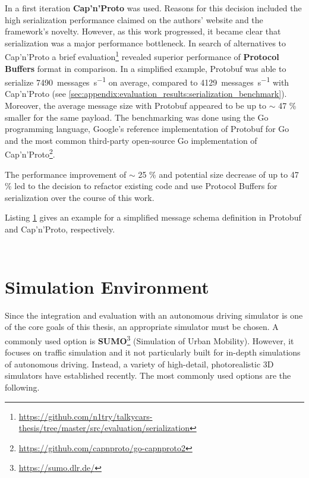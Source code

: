 In a first iteration \textbf{Cap'n'Proto} was used. Reasons for this decision included the high serialization performance claimed on the authors' website and the framework's novelty. However, as this work progressed, it became clear that serialization was a major performance bottleneck. In search of alternatives to Cap'n'Proto a brief evaluation\footnote{\url{https://github.com/n1try/talkycars-thesis/tree/master/src/evaluation/serialization}} revealed superior performance of \textbf{Protocol Buffers} format in comparison. In a simplified example, Protobuf was able to serialize \SI{7490}{messages\per\second} on average, compared to \SI{4129}{messages\per\second} with Cap'n'Proto (see \cref{sec:appendix:evaluation_results:serialization_benchmark}). Moreover, the average message size with Protobuf appeared to be up to $\sim$ 47 \% smaller for the same payload. The benchmarking was done using the Go programming language, Google's reference implementation of Protobuf for Go and the most common third-party open-source Go implementation of Cap'n'Proto\footnote{\url{https://github.com/capnproto/go-capnproto2}}. 

The performance improvement of $\sim$ 25 \% and potential size decrease of up to 47 \% led to the decision to refactor existing code and use Protocol Buffers for serialization over the course of this work.

Listing \ref{lst:serialization_schema_examples} gives an example for a simplified message schema definition in Protobuf and Cap'n'Proto, respectively.

\begin{figure}[!h]
	\begin{minipage}{0.5\textwidth}
		\centering
		\inputminted[fontsize=\footnotesize]{text}{97_listings/protobuf_snippet.proto}
	\end{minipage}
	\begin{minipage}{0.5\textwidth}
		\centering
		\inputminted[fontsize=\footnotesize]{text}{97_listings/capnp_snippet.capnp}
	\end{minipage}
	\label{lst:serialization_schema_examples}
\end{figure}

\section{Simulation Environment}
\label{sec:implementation:simulation_environment}
Since the integration and evaluation with an autonomous driving simulator is one of the core goals of this thesis, an appropriate simulator must be chosen. A commonly used option is \textbf{SUMO}\footnote{\url{https://sumo.dlr.de/}} (Simulation of Urban Mobility). However, it focuses on traffic simulation and it not particularly built for in-depth simulations of autonomous driving. Instead, a variety of high-detail, photorealistic 3D simulators have established recently. The most commonly used options are the following.

